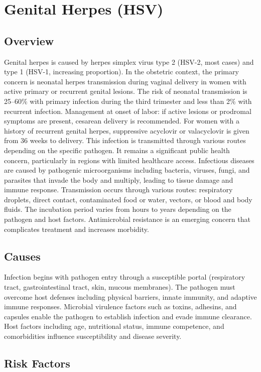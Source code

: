 \chapter{Genital Herpes (HSV)}
\label{sec:Genital Herpes}

\section{Overview}
Genital herpes is caused by herpes simplex virus type 2 (HSV-2, most cases) and type 1 (HSV-1, increasing proportion). In the obstetric context, the primary concern is neonatal herpes transmission during vaginal delivery in women with active primary or recurrent genital lesions. The risk of neonatal transmission is 25--60\% with primary infection during the third trimester and less than 2\% with recurrent infection. Management at onset of labor: if active lesions or prodromal symptoms are present, cesarean delivery is recommended. For women with a history of recurrent genital herpes, suppressive acyclovir or valacyclovir is given from 36 weeks to delivery. This infection is transmitted through various routes depending on the specific pathogen. It remains a significant public health concern, particularly in regions with limited healthcare access. Infectious diseases are caused by pathogenic microorganisms including bacteria, viruses, fungi, and parasites that invade the body and multiply, leading to tissue damage and immune response. Transmission occurs through various routes: respiratory droplets, direct contact, contaminated food or water, vectors, or blood and body fluids. The incubation period varies from hours to years depending on the pathogen and host factors. Antimicrobial resistance is an emerging concern that complicates treatment and increases morbidity.
\section{Causes}
Infection begins with pathogen entry through a susceptible portal (respiratory tract, gastrointestinal tract, skin, mucous membranes). The pathogen must overcome host defenses including physical barriers, innate immunity, and adaptive immune responses. Microbial virulence factors such as toxins, adhesins, and capsules enable the pathogen to establish infection and evade immune clearance. Host factors including age, nutritional status, immune competence, and comorbidities influence susceptibility and disease severity.
\section{Risk Factors}

